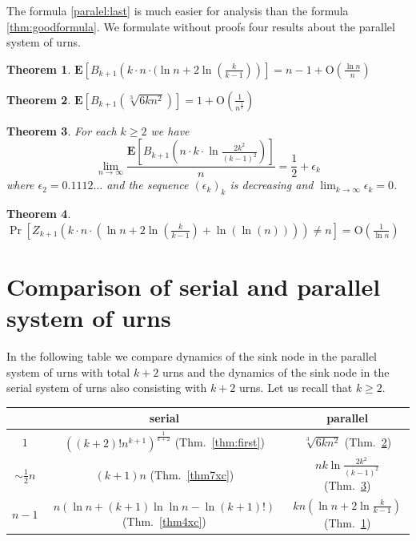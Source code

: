 \documentclass[submission]{dmtcs}
\newtheorem{theorem}{Theorem}
\newcommand{\E}[1]{\mathbf{E}\left[#1\right]}
\newcommand{\BigO}[1]{\mathrm{O}\left(#1\right)}
\begin{document}
The formula \ref{paralel:last} is much easier for analysis than the formula
\ref{thm:goodformula}. We formulate without proofs four results about
the parallel system of urns.
 
\begin{theorem}\label{thm8xc}
$
  \E{B_{k+1}\left(k\cdot n\cdot (\ln n + 2 \ln(\frac{k}{k-1})\right)} = 
	  n-1 + \BigO{\frac{\ln n}{n}}
$
\end{theorem}

\begin{theorem}\label{thm9xc}
$
  \E{B_{k+1}\left(\sqrt[3]{6 k n^2}\right)} = 1 + \BigO{\frac{1}{n^\frac13}}
$
\end{theorem}

\begin{theorem}\label{thm10xc} For each $k\geq 2$ we have
$$
  \lim_{n\to\infty}\frac{\E{B_{k+1}\left( n\cdot k\cdot \ln\frac{2 k^2}{(k-1)^2}\right)}}{n} = 
	  \frac12 + \epsilon_k
$$
where $\epsilon_2=0.1112\ldots$ and the sequence $(\epsilon_k)_k$ is decreasing 
and $\lim_{k\to\infty}\epsilon_k = 0$.
\end{theorem}
\begin{theorem}
$
\Pr[Z_{k+1}(k \cdot n \cdot(\ln n + 2 \ln(\frac{k}{k-1})+\ln(\ln(n))))\neq n] = \BigO{\frac{1}{\ln n}}
$
\end{theorem}

\section{Comparison of serial and parallel system of urns}\label{Comparison}

In the following table we compare dynamics of the sink node in 
the parallel system of 
urns with total $k+2$ urns and the dynamics of the sink node in the 
serial system of urns also consisting with $k+2$ 
urns. Let us recall that $k\geq 2$.

\begin{center}
\begin{tabular}{|c|c|c|}
\hline
 &serial&parallel\\
\hline
$1$ & $((k+2)! n^{k+1})^{\frac{1}{k+2}}$ (Thm.~\ref{thm:first}) & $\sqrt[3]{6 k n^2}$ (Thm.~\ref{thm9xc})\\
\hline
$\sim\frac12 n$ & $(k+1)n$ (Thm.~\ref{thm7xc})& $n k \ln\frac{2 k^2}{(k-1)^2}$ (Thm.~\ref{thm10xc}) \\
\hline
$n-1$ & $n(\ln n  + (k+1)\ln\ln n - \ln(k+1)!)$ (Thm.~\ref{thm4xc})  & $k n (\ln n  + 2 \ln\frac{k}{k-1})$ (Thm.~\ref{thm8xc})\\
\hline
\end{tabular}
\end{center}
\end{document}
